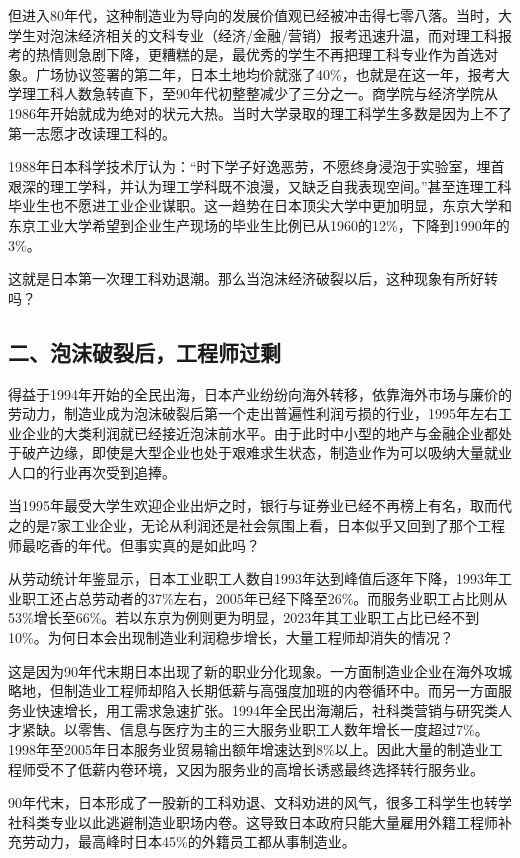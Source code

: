 但进入80年代，这种制造业为导向的发展价值观已经被冲击得七零八落。当时，大学生对泡沫经济相关的文科专业（经济/金融/营销）报考迅速升温，而对理工科报考的热情则急剧下降，更糟糕的是，最优秀的学生不再把理工科专业作为首选对象。广场协议签署的第二年，日本土地均价就涨了40\%，也就是在这一年，报考大学理工科人数急转直下，至90年代初整整减少了三分之一。商学院与经济学院从1986年开始就成为绝对的状元大热。当时大学录取的理工科学生多数是因为上不了第一志愿才改读理工科的。

1988年日本科学技术厅认为：“时下学子好逸恶劳，不愿终身浸泡于实验室，埋首艰深的理工学科，并认为理工学科既不浪漫，又缺乏自我表现空间。”甚至连理工科毕业生也不愿进工业企业谋职。这一趋势在日本顶尖大学中更加明显，东京大学和东京工业大学希望到企业生产现场的毕业生比例已从1960的12\%，下降到1990年的3\%。

这就是日本第一次理工科劝退潮。那么当泡沫经济破裂以后，这种现象有所好转吗？

\subsection{二、泡沫破裂后，工程师过剩}

得益于1994年开始的全民出海，日本产业纷纷向海外转移，依靠海外市场与廉价的劳动力，制造业成为泡沫破裂后第一个走出普遍性利润亏损的行业，1995年左右工业企业的大类利润就已经接近泡沫前水平。由于此时中小型的地产与金融企业都处于破产边缘，即使是大型企业也处于艰难求生状态，制造业作为可以吸纳大量就业人口的行业再次受到追捧。

当1995年最受大学生欢迎企业出炉之时，银行与证券业已经不再榜上有名，取而代之的是7家工业企业，无论从利润还是社会氛围上看，日本似乎又回到了那个工程师最吃香的年代。但事实真的是如此吗？

从劳动统计年鉴显示，日本工业职工人数自1993年达到峰值后逐年下降，1993年工业职工还占总劳动者的37\%左右，2005年已经下降至26\%。而服务业职工占比则从53\%增长至66\%。若以东京为例则更为明显，2023年其工业职工占比已经不到10\%。为何日本会出现制造业利润稳步增长，大量工程师却消失的情况？

这是因为90年代末期日本出现了新的职业分化现象。一方面制造业企业在海外攻城略地，但制造业工程师却陷入长期低薪与高强度加班的内卷循环中。而另一方面服务业快速增长，用工需求急速扩张。1994年全民出海潮后，社科类营销与研究类人才紧缺。以零售、信息与医疗为主的三大服务业职工人数年增长一度超过7\%。1998年至2005年日本服务业贸易输出额年增速达到8\%以上。因此大量的制造业工程师受不了低薪内卷环境，又因为服务业的高增长诱惑最终选择转行服务业。

90年代末，日本形成了一股新的工科劝退、文科劝进的风气，很多工科学生也转学社科类专业以此逃避制造业职场内卷。这导致日本政府只能大量雇用外籍工程师补充劳动力，最高峰时日本45\%的外籍员工都从事制造业。

